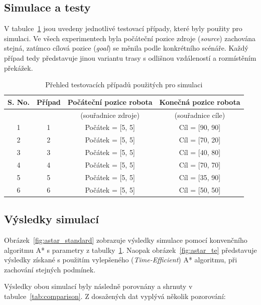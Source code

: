 \documentclass[10pt, a4paper]{article}
\begin{document}
\newpage
\subsection{Simulace a testy}
V tabulce~\ref{tab:testcases} jsou uvedeny jednotlivé testovací případy, které byly použity pro simulaci.
Ve všech experimentech byla počáteční pozice zdroje (\textit{source}) zachována stejná, zatímco cílová pozice (\textit{goal}) se měnila podle konkrétního scénáře.
Každý případ tedy představuje jinou variantu trasy s odlišnou vzdáleností a rozmístěním překážek.

\begin{table}[H]
\centering
\caption{Přehled testovacích případů použitých pro simulaci}
\label{tab:testcases}
\begin{tabular}{|c|c|c|c|}
\hline
\textbf{S. No.} & \textbf{Případ} & \textbf{Počáteční pozice robota} & \textbf{Konečná pozice robota} \\ \hline
 &  & (souřadnice zdroje) & (souřadnice cíle) \\ \hline
1 & 1 & Počátek = [5, 5] & Cíl = [90, 90] \\ \hline
2 & 2 & Počátek = [5, 5] & Cíl = [70, 20] \\ \hline
3 & 3 & Počátek = [5, 5] & Cíl = [40, 80] \\ \hline
4 & 4 & Počátek = [5, 5] & Cíl = [70, 70] \\ \hline
5 & 5 & Počátek = [5, 5] & Cíl = [35, 90] \\ \hline
6 & 6 & Počátek = [5, 5] & Cíl = [50, 50] \\ \hline
\end{tabular}
\end{table}

\subsection{Výsledky simulací}

Obrázek~\ref{fig:astar_standard} zobrazuje výsledky simulace pomocí konvenčního algoritmu A* s parametry z tabulky~\ref{tab:testcases}.
Naopak obrázek~\ref{fig:astar_te} představuje výsledky získané s použitím vylepšeného (\textit{Time-Efficient}) A* algoritmu, při zachování stejných podmínek.

Výsledky obou simulací byly následně porovnány a shrnuty v tabulce~\ref{tab:comparison}.
Z dosažených dat vyplývá několik pozorování:
\end{document}
